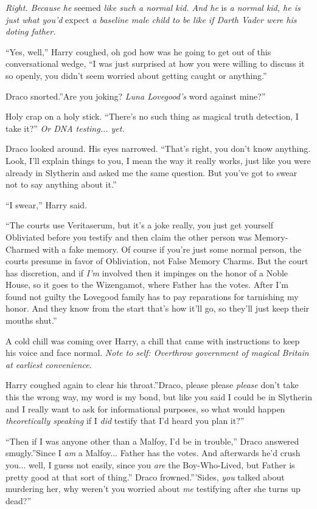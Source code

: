 \emph{Right. Because he} seemed \emph{like such a normal kid. And he} is
\emph{a normal kid, he is just what you'd} expect \emph{a baseline male
child to be like if Darth Vader were his doting father.}

``Yes, well,'' Harry coughed, oh god how was he going to get out of this
conversational wedge, ``I was just surprised at how you were willing to
discuss it so openly, you didn't seem worried about getting caught or
anything.''

Draco snorted.''Are you joking? \emph{Luna Lovegood's} word against
mine?''

Holy crap on a holy stick. ``There's no such thing as magical truth
detection, I take it?'' \emph{Or DNA testing... yet.}

Draco looked around. His eyes narrowed. ``That's right, you don't know
anything. Look, I'll explain things to you, I mean the way it really
works, just like you were already in Slytherin and asked me the same
question. But you've got to swear not to say anything about it.''

``I swear,'' Harry said.

``The courts use Veritaserum, but it's a joke really, you just get
yourself Obliviated before you testify and then claim the other person
was Memory-Charmed with a fake memory. Of course if you're just some
normal person, the courts presume in favor of Obliviation, not False
Memory Charms. But the court has discretion, and if \emph{I'm} involved
then it impinges on the honor of a Noble House, so it goes to the
Wizengamot, where Father has the votes. After I'm found not guilty the
Lovegood family has to pay reparations for tarnishing my honor. And they
know from the start that's how it'll go, so they'll just keep their
mouths shut.''

A cold chill was coming over Harry, a chill that came with instructions
to keep his voice and face normal. \emph{Note to self: Overthrow
government of magical Britain at earliest convenience.}

Harry coughed again to clear his throat.''Draco, please please
\emph{please} don't take this the wrong way, my word is my bond, but
like you said I could be in Slytherin and I really want to ask for
informational purposes, so what would happen \emph{theoretically
speaking} if I \emph{did} testify that I'd heard you plan it?''

``Then if I was anyone other than a Malfoy, I'd be in trouble,'' Draco
answered smugly.''Since I \emph{am} a Malfoy... Father has the
votes. And afterwards he'd crush you... well, I guess not easily,
since you \emph{are} the Boy-Who-Lived, but Father is pretty good at
that sort of thing.'' Draco frowned.'''Sides, \emph{you} talked about
murdering her, why weren't you worried about \emph{me} testifying after
she turns up dead?''


